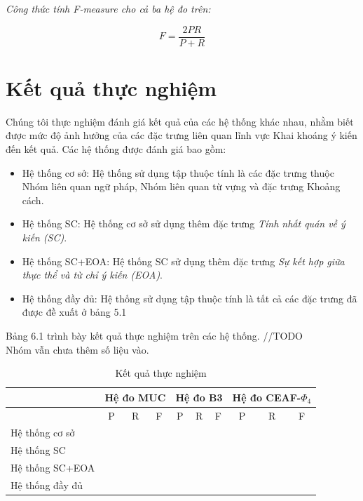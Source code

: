 \documentclass[12pt]{report}
\begin{document}
			\par \textit{Công thức tính F-measure cho cả ba hệ đo trên:}
				\begin{center}					
					\begin{equation*}
						F = \frac{2PR}{P+R}
					\end{equation*}
				\end{center}

		\section{Kết quả thực nghiệm}
		Chúng tôi thực nghiệm đánh giá kết quả của các hệ thống khác nhau, nhằm biết được mức độ ảnh hưởng của các đặc trưng liên quan lĩnh vực Khai khoáng ý kiến đến kết quả. Các hệ thống được đánh giá bao gồm:
			\begin{itemize}
				\item{Hệ thống cơ sở: Hệ thống sử dụng tập thuộc tính là các đặc trưng thuộc Nhóm liên quan ngữ pháp, Nhóm liên quan từ vựng và đặc trưng Khoảng cách}.
				\item{Hệ thống SC: Hệ thống cơ sở sử dụng thêm đặc trưng \textit{Tính nhất quán về ý kiến (SC)}}.
				\item{Hệ thống SC+EOA: Hệ thống SC sử dụng thêm đặc trưng \textit{Sự kết hợp giữa thực thể và từ chỉ ý kiến (EOA)}}.
				\item{Hệ thống đầy đủ: Hệ thống sử dụng tập thuộc tính là tất cả các đặc trưng đã được đề xuất ở bảng 5.1}
			\end{itemize}
		Bảng 6.1 trình bày kết quả thực nghiệm trên các hệ thống.
		//TODO
		\\Nhóm vẫn chưa thêm số liệu vào.
				\begin{table}[]
				\centering				
				\label{my-label}
				\begin{tabular}{|l|c|c|c|c|c|c|c|c|c|}
				\hline
				                & \multicolumn{3}{c|}{Hệ đo MUC} & \multicolumn{3}{c|}{Hệ đo B3} & \multicolumn{3}{c|}{Hệ đo CEAF-$\Phi_4$} \\ \hline
				                & P        & R        & F        & P        & R        & F       & P         & R         & F         \\ \hline
				Hệ thống cơ sở  &          &          &          &          &          &         &           &           &           \\ \hline
				Hệ thống SC     &          &          &          &          &          &         &           &           &           \\ \hline
				Hệ thống SC+EOA &          &          &          &          &          &         &           &           &           \\ \hline
				Hệ thống đầy đủ &          &          &          &          &          &         &           &           &           \\ \hline
				\end{tabular}
				\caption{Kết quả thực nghiệm}
				\end{table}
\end{document}
